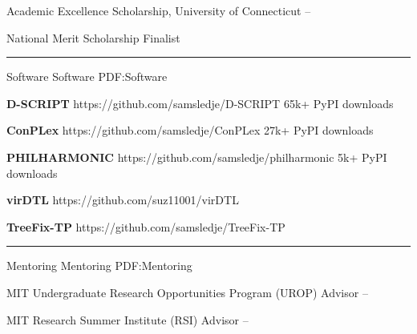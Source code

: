 \documentclass[letterpaper,MMMyyyy,nonstopmode]{simpleresumecv}
\begin{document}
\begin{Body}
\Entry
{Academic Excellence Scholarship, University of Connecticut}
\hfill
{} -- 
\Gap




\Entry
{National Merit Scholarship Finalist}
\hfill
{}

\BigGap
\hrule
\Section
{Software}
{Software}
{PDF:Software}

\Entry
{\textbf{D-SCRIPT}}
\hfill https://github.com/samsledje/D-SCRIPT
\Gap
\Item
65k+ PyPI downloads
\BigGap

\Entry
{\textbf{ConPLex}}
\hfill https://github.com/samsledje/ConPLex
\Gap
\Item
27k+ PyPI downloads
\BigGap

\Entry
{\textbf{PHILHARMONIC}}
\hfill https://github.com/samsledje/philharmonic
\Gap
\Item
5k+ PyPI downloads
\BigGap

\Entry
{\textbf{virDTL}}
\hfill https://github.com/suz11001/virDTL
\BigGap

\Entry
{\textbf{TreeFix-TP}}
\hfill https://github.com/samsledje/TreeFix-TP
\BigGap



\BigGap
\hrule
\Section
{Mentoring}
{Mentoring}
{PDF:Mentoring}

\Entry
{MIT Undergraduate Research Opportunities Program (UROP) Advisor}
\hfill
{} -- 
\Gap

\Entry
{MIT Research Summer Institute (RSI) Advisor}
\hfill
{} -- 
\Gap


\end{Body}
\end{document}
